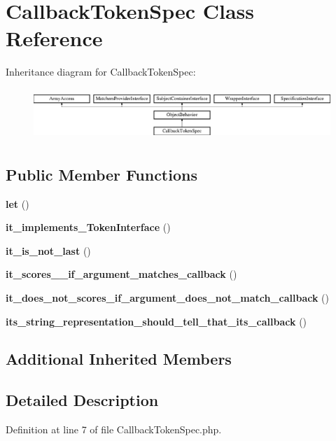 \section{Callback\+Token\+Spec Class Reference}
\label{classspec_1_1_prophecy_1_1_argument_1_1_token_1_1_callback_token_spec}
Inheritance diagram for Callback\+Token\+Spec\+:\begin{figure}[H]
\begin{center}
\leavevmode
\includegraphics[height=1.953488cm]{classspec_1_1_prophecy_1_1_argument_1_1_token_1_1_callback_token_spec}
\end{center}
\end{figure}
\subsection*{Public Member Functions}
\begin{DoxyCompactItemize}
\item 
{\bf let} ()
\item 
{\bf it\+\_\+implements\+\_\+\+Token\+Interface} ()
\item 
{\bf it\+\_\+is\+\_\+not\+\_\+last} ()
\item 
{\bf it\+\_\+scores\+\_\+\_\+if\+\_\+argument\+\_\+matches\+\_\+callback} ()
\item 
{\bf it\+\_\+does\+\_\+not\+\_\+scores\+\_\+if\+\_\+argument\+\_\+does\+\_\+not\+\_\+match\+\_\+callback} ()
\item 
{\bf its\+\_\+string\+\_\+representation\+\_\+should\+\_\+tell\+\_\+that\+\_\+its\+\_\+callback} ()
\end{DoxyCompactItemize}
\subsection*{Additional Inherited Members}


\subsection{Detailed Description}


Definition at line 7 of file Callback\+Token\+Spec.\+php.



